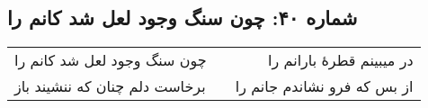 \begin{center}
\section*{شماره ۴۰: چون سنگ وجود لعل شد کانم را}
\label{sec:040}
\begin{longtable}{l p{0.5cm} r}
چون سنگ وجود لعل شد کانم را
&&
در میبینم قطرهٔ بارانم را
\\
برخاست دلم چنان که ننشیند باز
&&
از بس که فرو نشاندم جانم را
\\
\end{longtable}
\end{center}
